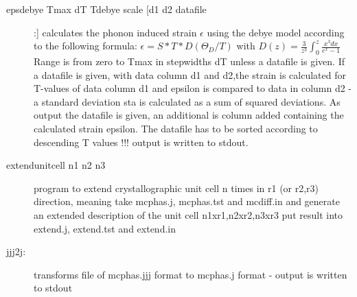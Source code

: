 \begin{description}
\item [\prg epsdebye Tmax dT Tdebye scale [d1 d2 datafile]:]	        
		    calculates the phonon induced strain $\epsilon$ using the debye model
		    according to the following formula:
		    $   \epsilon=S*T*D(\Theta_{D}/T) $
				    with    
		    $D(z)=\frac{3}{z^3}\int_0^z \frac{x^3 dx}{e^x-1}$
                 Range is from zero to Tmax in stepwidths dT
		 unless a datafile is given. 
                 If a  datafile is given, with data column d1 and d2,the strain
                 is calculated for T-values of data column d1 and epsilon
		  is compared to data in column d2 - a standard 
                 deviation sta is calculated as a sum of squared deviations.
                 As output the datafile is given, an additional is column added 
		 containing the calculated strain epsilon. The datafile has to
		 be sorted according to descending T values !!!
                 output is written to stdout.

\item [\prg extendunitcell n1 n2 n3]program to extend crystallographic %
unit cell n 
                times in r1 (or r2,r3) direction, meaning take mcphas.j, mcphas.tst 
                and mcdiff.in and generate an extended description of the unit %
cell 
                n1xr1,n2xr2,n3xr3 put result into extend.j, extend.tst and extend.in

\item [\prg jjj2j:] transforms file of {\prg mcphas.jjj} format to {\prg %
mcphas.j} format
- output is written to stdout


\end{description}
